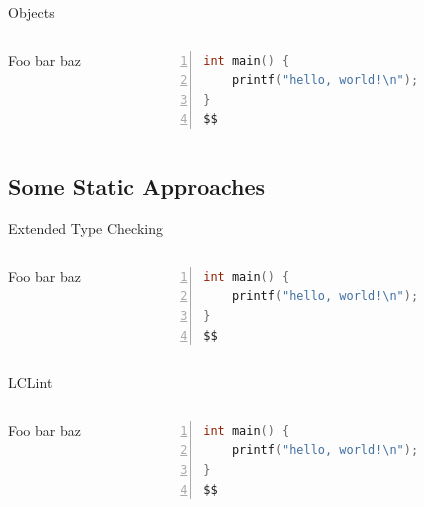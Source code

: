 \documentclass[aspectratio=169]{beamer}
\begin{document}
\begin{frame}[fragile]{Objects}
  \footnotesize
  \begin{columns}[T]
    \begin{column}{0.45\textwidth}
        Foo bar baz
    \end{column}
    \begin{column}{0.45\textwidth}
%      
       \begin{lstlisting}[language=C,numbers=left,mathescape,basicstyle={\footnotesize\ttfamily}]
int main() {
    printf("hello, world!\n");
}
$$
        \end{lstlisting}
    \end{column}
  \end{columns}
\end{frame}

\subsection{Some Static Approaches}

\begin{frame}[fragile]{Extended Type Checking}
  \footnotesize
  \begin{columns}[T]
    \begin{column}{0.45\textwidth}
        Foo bar baz
    \end{column}
    \begin{column}{0.45\textwidth}
%      
       \begin{lstlisting}[language=C,numbers=left,mathescape,basicstyle={\footnotesize\ttfamily}]
int main() {
    printf("hello, world!\n");
}
$$
        \end{lstlisting}
    \end{column}
  \end{columns}
\end{frame}

\begin{frame}[fragile]{LCLint}
  \footnotesize
  \begin{columns}[T]
    \begin{column}{0.45\textwidth}
        Foo bar baz
    \end{column}
    \begin{column}{0.45\textwidth}
%      
       \begin{lstlisting}[language=C,numbers=left,mathescape,basicstyle={\footnotesize\ttfamily}]
int main() {
    printf("hello, world!\n");
}
$$
        \end{lstlisting}
    \end{column}
  \end{columns}
\end{frame}
\end{document}
